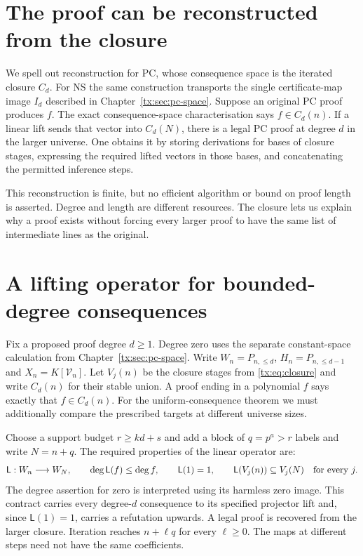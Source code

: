 \documentclass[11pt,a4paper,oneside,openany]{book}
\theoremstyle{definition}\newtheorem{definition}[theorem]{Definition}
\theoremstyle{remark}\newtheorem{remark}[theorem]{Remark}
\numberwithin{equation}{chapter}
\begin{document}
\section{The proof can be reconstructed from the closure}
We spell out reconstruction for PC, whose consequence space is the
iterated closure $C_d$. For NS the same construction transports the
single certificate-map image $I_d$ described in
Chapter~\ref{tx:sec:pc-space}.
Suppose an original PC proof produces $f$. The exact consequence-space
characterisation says $f\in C_d(n)$. If a linear lift sends that vector
into $C_d(N)$, there is a legal PC proof at degree $d$ in the larger
universe. One obtains it by storing derivations for bases of closure
stages, expressing the required lifted vectors in those bases, and
concatenating the permitted inference steps.

This reconstruction is finite, but no efficient algorithm or bound on
proof length is asserted. Degree and length are different resources.
The closure lets us explain why a proof exists without forcing every
larger proof to have the same list of intermediate lines as the original.

\section{A lifting operator for bounded-degree consequences}
Fix a proposed proof degree $d\ge1$. Degree zero uses the separate constant-space calculation from Chapter~\ref{tx:sec:pc-space}. Write $W_n=P_{n,\le d}$,
$H_n=P_{n,\le d-1}$ and $X_n=K[\mathcal V_n]$.
Let $V_j(n)$ be the closure stages from \eqref{tx:eq:closure} and write
$C_d(n)$ for their stable union. A proof ending in a polynomial $f$ says exactly that
$f\in C_d(n)$. For the uniform-consequence theorem we must additionally
compare the prescribed targets at different universe sizes.

Choose a support budget $r\ge kd+s$ and add a block of $q=p^a>r$ labels and write $N=n+q$.
The required properties of the linear operator are:
\begin{equation}\label{tx:eq:newcontract}
 \mathsf L:W_n\longrightarrow W_N,\qquad
 \deg\mathsf L(f)\le\deg f,\qquad \mathsf L(1)=1,\qquad
 \mathsf L(V_j(n))\subseteq V_j(N)\quad\hbox{for every }j.
\end{equation}
The degree assertion for zero is interpreted using its harmless zero
image. This contract carries every degree-$d$ consequence to its specified
projector lift and, since $\mathsf L(1)=1$, carries a refutation
upwards. A legal proof is recovered from the larger closure. Iteration reaches $n+\ell q$ for every $\ell\ge0$.
The maps at different steps need not have the same coefficients.
\end{document}
